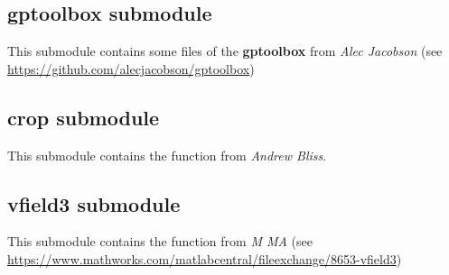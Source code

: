 \subsection{gptoolbox submodule}
This submodule contains some files of the \textbf{gptoolbox} from \textit{Alec Jacobson}
(see \url{https://github.com/alecjacobson/gptoolbox})

\subsection{crop submodule}
This submodule contains the function  from \textit{Andrew Bliss}.

\subsection{vfield3 submodule}
This submodule contains the function  from \textit{M MA} (see 
\url{https://www.mathworks.com/matlabcentral/fileexchange/8653-vfield3})
